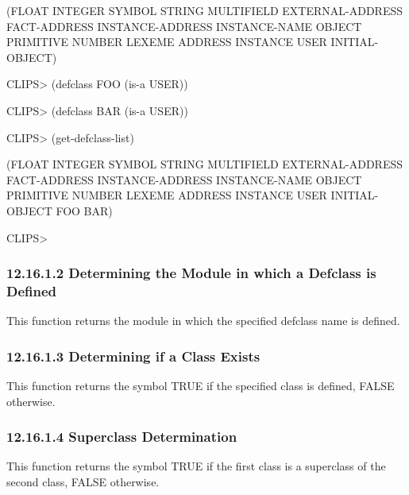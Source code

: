 \documentclass[letterpaper,10pt,english]{sphinxmanual}
\begin{document}
(FLOAT INTEGER SYMBOL STRING MULTIFIELD EXTERNAL-ADDRESS FACT-ADDRESS
INSTANCE-ADDRESS INSTANCE-NAME OBJECT PRIMITIVE NUMBER LEXEME ADDRESS
INSTANCE USER INITIAL-OBJECT)

CLIPS\textgreater{} (defclass FOO (is-a USER))

CLIPS\textgreater{} (defclass BAR (is-a USER))

CLIPS\textgreater{} (get-defclass-list)

(FLOAT INTEGER SYMBOL STRING MULTIFIELD EXTERNAL-ADDRESS FACT-ADDRESS
INSTANCE-ADDRESS INSTANCE-NAME OBJECT PRIMITIVE NUMBER LEXEME ADDRESS
INSTANCE USER INITIAL-OBJECT FOO BAR)

CLIPS\textgreater{}


\subsubsection{12.16.1.2 Determining the Module in which a Defclass is Defined}
\label{\detokenize{actions:determining-the-module-in-which-a-defclass-is-defined}}
This function returns the module in which the specified defclass name is
defined.


\begin{sphinxVerbatim}[commandchars=\\\{\}]
 
\end{sphinxVerbatim}


\subsubsection{12.16.1.3 Determining if a Class Exists}
\label{\detokenize{actions:determining-if-a-class-exists}}
This function returns the symbol TRUE if the specified class is defined,
FALSE otherwise.


\begin{sphinxVerbatim}[commandchars=\\\{\}]
 
\end{sphinxVerbatim}


\subsubsection{12.16.1.4 Superclass Determination}
\label{\detokenize{actions:superclass-determination}}
This function returns the symbol TRUE if the first class is a superclass
of the second class, FALSE otherwise.
\end{document}
